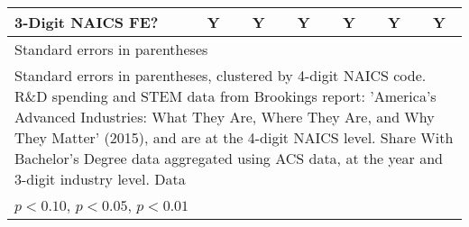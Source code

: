 \begin{table}[htbp]
\begin{tabular}{l*{6}{c}}
3-Digit NAICS FE?&        Y         &        Y         &        Y         &        Y         &        Y         &        Y         \\
\bottomrule
\multicolumn{7}{l}{\footnotesize Standard errors in parentheses}\\
\multicolumn{7}{l}{\footnotesize Standard errors in parentheses, clustered by 4-digit NAICS code. R\&D spending and STEM data from Brookings report: 'America's Advanced Industries: What They Are, Where They Are, and Why They Matter' (2015), and are at the 4-digit NAICS level. Share With Bachelor's Degree data aggregated using ACS data, at the year and 3-digit industry level. Data}\\
\multicolumn{7}{l}{\footnotesize \sym{*} \(p<0.10\), \sym{**} \(p<0.05\), \sym{***} \(p<0.01\)}\\
\end{tabular}
\end{table}
